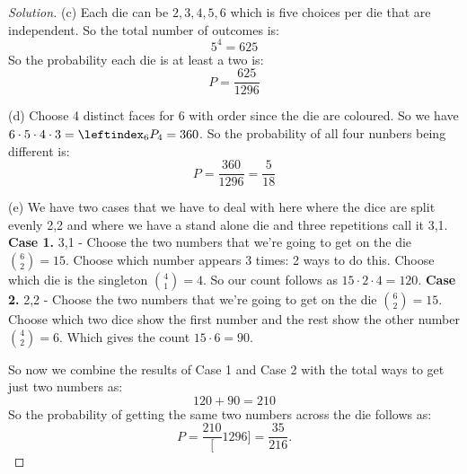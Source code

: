 \documentclass[12pt]{amsart}
\newenvironment{solution}
{\begin{proof}[Solution]}
{\end{proof}}
\begin{document}
\begin{onehalfspace}
\begin{solution}
            (c) Each die can be $2, 3, 4, 5, 6$ which is five choices per die that are independent. So the total
            number of outcomes is:
            \begin{displaymath}
                5^4 = 625
            \end{displaymath}
            So the probability each die is at least a two is:
            \begin{displaymath}
                P = \frac{625}{1296}
            \end{displaymath}

            (d) Choose 4 distinct faces for 6 with order since the die are coloured. So we
            have $6 \cdot 5 \cdot 4 \cdot 3 = \leftindex_6 P_4 = 360$. So the probability of all
            four nunbers being different is:
            \begin{displaymath}
                P = \frac{360}{1296} = \frac{5}{18}
            \end{displaymath}

            (e) We have two cases that we have to deal with here where the dice are split evenly 2,2
            and where we have a stand alone die and three repetitions call it 3,1.
            \textbf{Case 1.} 3,1 - Choose the two numbers that we're going to get on the die $\binom{6}{2} = 15$.
            Choose which number appears 3 times: 2 ways to do this. Choose which die is the singleton $\binom{4}{1} = 4$.
            So our count follows as $15 \cdot 2 \cdot 4 = 120$.
            \textbf{Case 2.} 2,2 - Choose the two numbers that we're going to get on the die $\binom{6}{2} = 15$. Choose
            which two dice show the first number and the rest show the other number $\binom{4}{2} = 6$. Which gives the
            count $15 \cdot 6 = 90$.

            So now we combine the results of Case 1 and Case 2 with the total ways to get just two numbers
            as:
            \begin{displaymath}
                120 + 90 = 210
            \end{displaymath}
            So the probability of getting the same two numbers across the die follows as:
            \begin{displaymath}
                P = \frac{210}[1296] = \frac{35}{216}.
            \end{displaymath}
        \end{solution}
    \end{onehalfspace}
\end{document}
